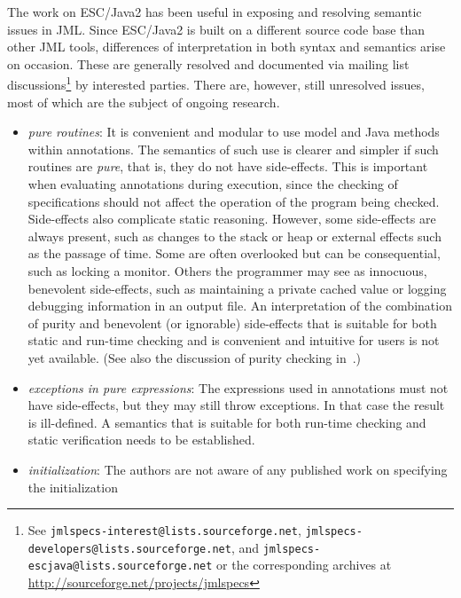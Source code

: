 \documentclass{sig-alternate}
\begin{document}
The work on ESC/Java2 has been useful in exposing and resolving
semantic issues in JML.  Since ESC/Java2 is built on a different
source code base than other JML tools, differences of interpretation
in both syntax and semantics arise on occasion.  These are generally
resolved and documented via mailing list discussions\footnote{See \texttt{jmlspecs-interest@lists.sourceforge.net}, 
\texttt{jmlspecs-developers@lists.sourceforge.net}, and
\texttt{jmlspecs-escjava@lists.sourceforge.net} or the corresponding archives at \url{http://sourceforge.net/projects/jmlspecs}}
by interested
parties.  There are, however, still unresolved issues, most of which
are the subject of ongoing research.
\setlength{\partopsep}{0in}\setlength{\parskip}{0in}\setlength{\itemsep}{0in}\setlength{\topsep}{0in}
\begin{itemize}
\setlength{\partopsep}{0in}\setlength{\parskip}{0in}\setlength{\itemsep}{0in}\setlength{\topsep}{0in}
\item \textit{pure routines}:  It is convenient and modular to use model and Java methods within
annotations.  The semantics of such use is clearer and simpler if such routines are {\em pure}, that is, they do not have side-effects.  This is important when evaluating annotations during
execution, since the checking of specifications should not affect the operation of the program being
checked.  Side-effects also complicate static reasoning.   However, some side-effects are
always present, such as changes to the stack or heap or external effects such as the passage of time.  Some are often overlooked but can be consequential, such as locking a monitor. 
 Others the programmer may
see as innocuous, benevolent side-effects, such as maintaining a private cached value or logging debugging information in an output file.
An interpretation of the combination of purity and benevolent (or ignorable)
  side-effects that is suitable for both static and run-time checking and is convenient and intuitive
for users is not yet available. (See also the discussion of purity checking in~\cite{Leavens-etal03a}.)
\item \textit{exceptions in pure expressions}:  The expressions used in annotations must not have
side-effects, but they may still throw exceptions.  In that case the result is ill-defined.  A
semantics that is suitable for both run-time checking and static verification needs to be 
established.
\item \textit{initialization}:  The authors are not aware of any published work on specifying the initialization

\end{itemize}
\end{document}
